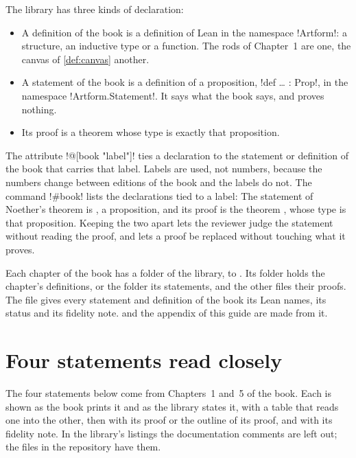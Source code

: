 The library has three kinds of declaration:
\begin{itemize}[leftmargin=1.4em]
\item A definition of the book is a definition of Lean in the namespace
  \li!Artform!: a structure, an inductive type or a function. The rods of
  Chapter~1 are one, the canvas of \cref{def:canvas} another.
\item A statement of the book is a definition of a proposition,
  \li!def … : Prop!, in the namespace \li!Artform.Statement!. It says what
  the book says, and proves nothing.
\item Its proof is a theorem whose type is exactly that proposition.
\end{itemize}
The attribute \li!@[book "label"]! ties a declaration to the statement or
definition of the book that carries that label. Labels are used, not
numbers, because the numbers change between editions of the book and the
labels do not. The command \li!#book! lists the declarations tied to a
label:
The statement of Noether's theorem is
, a proposition, and
its proof is the theorem , whose type is
that proposition. Keeping the two apart lets the reviewer judge the
statement without reading the proof, and lets a proof be replaced without
touching what it proves.

Each chapter of the book has a folder of the library,  to
. Its  folder holds the chapter's definitions,
 or the  folder its statements, and the
other files their proofs. The file  gives every
statement and definition of the book its Lean names, its status and its
fidelity note.  and the appendix of this guide are
made from it.

\section*{Four statements read closely}

The four statements below come from Chapters~1 and~5 of the book. Each is
shown as the book prints it and as the library states it, with a table that
reads one into the other, then with its proof or the outline of its proof,
and with its fidelity note. In the library's listings the documentation
comments are left out; the files in the repository have them.

